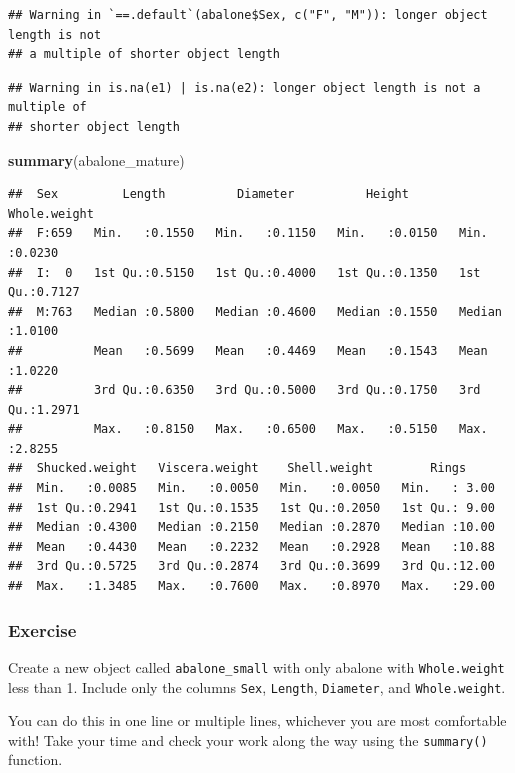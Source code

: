 \documentclass[
]{book}
\newenvironment{Shaded}{\begin{snugshade}}{\end{snugshade}}
\newcommand{\FunctionTok}[1]{\textcolor[rgb]{0.13,0.29,0.53}{\textbf{#1}}}
\newcommand{\NormalTok}[1]{#1}
\begin{document}
\begin{verbatim}
## Warning in `==.default`(abalone$Sex, c("F", "M")): longer object length is not
## a multiple of shorter object length
\end{verbatim}

\begin{verbatim}
## Warning in is.na(e1) | is.na(e2): longer object length is not a multiple of
## shorter object length
\end{verbatim}

\begin{Shaded}
\begin{Highlighting}[]
\FunctionTok{summary}\NormalTok{(abalone\_mature)}
\end{Highlighting}
\end{Shaded}

\begin{verbatim}
##  Sex         Length          Diameter          Height        Whole.weight   
##  F:659   Min.   :0.1550   Min.   :0.1150   Min.   :0.0150   Min.   :0.0230  
##  I:  0   1st Qu.:0.5150   1st Qu.:0.4000   1st Qu.:0.1350   1st Qu.:0.7127  
##  M:763   Median :0.5800   Median :0.4600   Median :0.1550   Median :1.0100  
##          Mean   :0.5699   Mean   :0.4469   Mean   :0.1543   Mean   :1.0220  
##          3rd Qu.:0.6350   3rd Qu.:0.5000   3rd Qu.:0.1750   3rd Qu.:1.2971  
##          Max.   :0.8150   Max.   :0.6500   Max.   :0.5150   Max.   :2.8255  
##  Shucked.weight   Viscera.weight    Shell.weight        Rings      
##  Min.   :0.0085   Min.   :0.0050   Min.   :0.0050   Min.   : 3.00  
##  1st Qu.:0.2941   1st Qu.:0.1535   1st Qu.:0.2050   1st Qu.: 9.00  
##  Median :0.4300   Median :0.2150   Median :0.2870   Median :10.00  
##  Mean   :0.4430   Mean   :0.2232   Mean   :0.2928   Mean   :10.88  
##  3rd Qu.:0.5725   3rd Qu.:0.2874   3rd Qu.:0.3699   3rd Qu.:12.00  
##  Max.   :1.3485   Max.   :0.7600   Max.   :0.8970   Max.   :29.00
\end{verbatim}

\subsubsection{Exercise}\label{exercise}

Create a new object called \texttt{abalone\_small} with only abalone with \texttt{Whole.weight} less than 1. Include only the columns \texttt{Sex}, \texttt{Length}, \texttt{Diameter}, and \texttt{Whole.weight}.

You can do this in one line or multiple lines, whichever you are most comfortable with! Take your time and check your work along the way using the \texttt{summary()} function.
\end{document}
